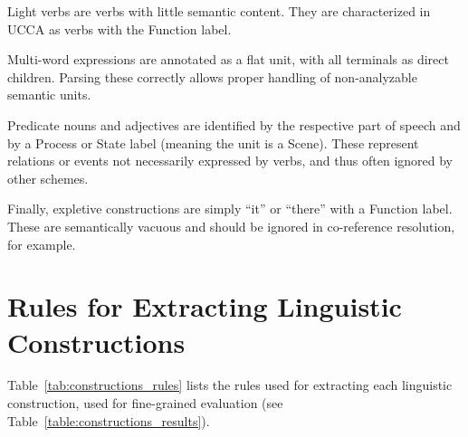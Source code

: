 \documentclass[11pt,a4paper]{article}
\newcommand{\tabref}[1]{Table~\ref{#1}}
\begin{document}
Light verbs are verbs with little semantic content.
They are characterized in UCCA as verbs with the Function label.

Multi-word expressions are annotated as a flat unit, with all terminals as
direct children. Parsing these correctly allows proper handling of
non-analyzable semantic units.

Predicate nouns and adjectives are identified by the respective part of speech
and by a Process or State label (meaning the unit is a Scene).
These represent relations or events not necessarily expressed by verbs,
and thus often ignored by other schemes.

Finally, expletive constructions are simply ``it'' or ``there'' with a Function
label. These are semantically vacuous and should be ignored in co-reference
resolution, for example.






\appendix
\section{Rules for Extracting Linguistic Constructions}
\label{appendix:constructions}

\tabref{tab:constructions_rules} lists the rules used for extracting each linguistic
construction, used for fine-grained evaluation (see \tabref{table:constructions_results}).

\begin{table}
\caption{Rules for extracting linguistic constructions.
All rules are on UCCA edges. For an edge $e$ in the graph,
$e.T$ refers to the set of tokens in $e$'s yield,
and $e.P$ to their coarse parts of speech.
$e.C$ refers to the set of outgoing edges from the edge's child,
and $e.\ell$ to the edge's UCCA label.}
\label{tab:constructions_rules}
\end{table}
\end{document}
